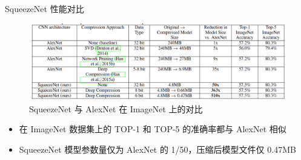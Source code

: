 \documentclass{beamer}
\begin{document}
\begin{frame}{SqueezeNet 性能对比}
    \begin{figure}
        \centering
        \includegraphics[width=0.8\linewidth]{pic/squeezenet_vs_alexnet.png}
        \caption{SqueezeNet 与 AlexNet 在 ImageNet 上的对比}
    \end{figure}
    
    \begin{itemize}
        \item 在 ImageNet 数据集上的 TOP-1 和 TOP-5 的准确率都与 AlexNet 相似
        \item SqueezeNet 模型参数量仅为 AlexNet 的 1/50，压缩后模型文件仅 0.47MB
    \end{itemize}
\end{frame}

\end{document}
